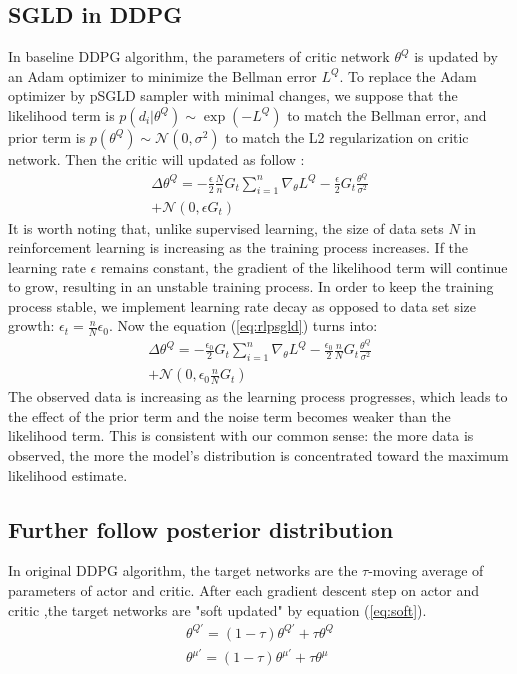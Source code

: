\subsection{SGLD in DDPG}
In baseline DDPG algorithm, the parameters of critic network $\theta^Q$ is updated by an Adam optimizer to minimize the Bellman error $L^Q$. To replace the Adam optimizer by pSGLD sampler with minimal changes, we suppose that the likelihood term is $p(d_i|\theta^Q)\sim\exp(-L^Q)$ to match the Bellman error, and prior term is $p(\theta^Q)\sim \mathcal{N}(0,\sigma^2)$ to match the L2 regularization on critic network. Then the critic will updated as follow :
\begin{equation}
   \label{eq:rlpsgld} 
   \begin{aligned}
      \Delta\theta^Q =-\frac{\epsilon}{2}\frac{N}{n}G_t\sum_{i=1}^{n}\nabla_\theta L^Q -\frac{\epsilon}{2}G_t \frac{\theta^Q}{\sigma^2}\\
      +\mathcal{N}(0,\epsilon G_t)
   \end{aligned}
\end{equation}
It is worth noting that, unlike supervised learning, the size of data sets $N$ in reinforcement learning is increasing as the training process increases. If the learning rate $\epsilon$ remains constant, the gradient of the likelihood term will continue to grow, resulting in an unstable training process. In order to keep the training process stable, we implement learning rate decay as opposed to data set size growth: $\epsilon_t=\frac{n}{N}\epsilon_0$. Now the equation (\ref{eq:rlpsgld}) turns into:
\begin{equation}
   \label{eq:rlpsgld1} 
   \begin{aligned}
      \Delta\theta^Q =-\frac{\epsilon_0}{2}G_t\sum_{i=1}^{n}\nabla_\theta L^Q -\frac{\epsilon_0}{2}\frac{n}{N}G_t \frac{\theta^Q}{\sigma^2}\\
      +\mathcal{N}(0,\epsilon_0\frac{n}{N} G_t)
   \end{aligned}
\end{equation}
The observed data is increasing as the learning process progresses, which leads to the effect of the prior term and the noise term becomes weaker than the likelihood term. This is consistent with our common sense: the more data is observed, the more the model's distribution is concentrated toward the maximum likelihood estimate.



\subsection{Further follow posterior distribution}
In original DDPG algorithm, the target networks are the $\tau$-moving average of parameters of actor and critic. After each gradient descent step on actor and critic ,the target networks are "soft updated" by equation (\ref{eq:soft}).
\begin{equation}
\label{eq:soft} 
\begin{aligned}
\theta^{Q'} = (1-\tau)\theta^{Q'}+\tau\theta^Q\\
\theta^{\mu'} = (1-\tau)\theta^{\mu'}+\tau\theta^\mu
\end{aligned}
\end{equation}

